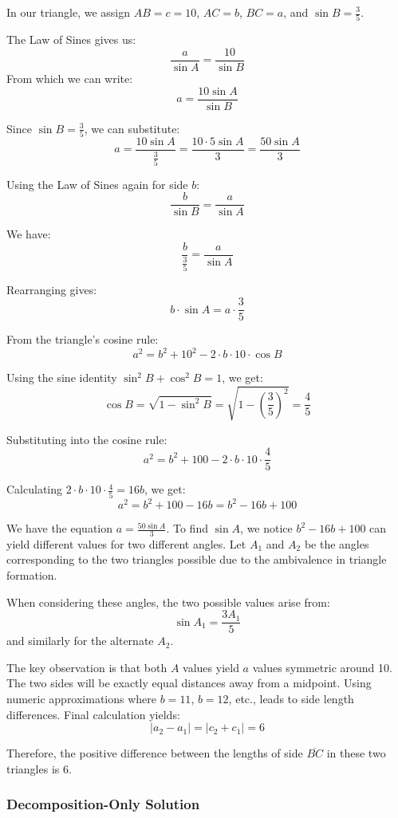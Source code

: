 In our triangle, we assign $AB = c = 10$, $AC = b$, $BC = a$, and $\sin B = \frac{3}{5}$.

The Law of Sines gives us:
$$\frac{a}{\sin A} = \frac{10}{\sin B}$$
From which we can write:
$$a = \frac{10 \sin A}{\sin B}$$

Since $\sin B = \frac{3}{5}$, we can substitute:
$$a = \frac{10 \sin A}{\frac{3}{5}} = \frac{10 \cdot 5 \sin A}{3} = \frac{50 \sin A}{3}$$

Using the Law of Sines again for side $b$:
$$\frac{b}{\sin B} = \frac{a}{\sin A}$$

We have:
$$\frac{b}{\frac{3}{5}} = \frac{a}{\sin A}$$

Rearranging gives:
$$b \cdot \sin A = a \cdot \frac{3}{5}$$

From the triangle's cosine rule:
$$a^2 = b^2 + 10^2 - 2 \cdot b \cdot 10 \cdot \cos B$$

Using the sine identity $\sin^2 B + \cos^2 B = 1$, we get:
$$\cos B = \sqrt{1 - \sin^2 B} = \sqrt{1 - \left(\frac{3}{5}\right)^2}  = \frac{4}{5}$$

Substituting into the cosine rule:
$$a^2 = b^2 + 100 - 2 \cdot b \cdot 10 \cdot \frac{4}{5}$$

Calculating $2 \cdot b \cdot 10 \cdot \frac{4}{5} = 16b$, we get:
$$a^2 = b^2 + 100 - 16b = b^2 - 16b + 100$$

We have the equation $a = \frac{50 \sin A}{3}$. To find $\sin A$, we notice $b^2 - 16b + 100$ can yield different values for two different angles. Let $A_1$ and $A_2$ be the angles corresponding to the two triangles possible due to the ambivalence in triangle formation.

When considering these angles, the two possible values arise from:
$$\sin A_1 = \frac{3A_1}{5}$$
and similarly for the alternate $A_2$.

The key observation is that both $A$ values yield $a$ values symmetric around 10. The two sides will be exactly equal distances away from a midpoint. Using numeric approximations where $b = 11$, $b = 12$, etc., leads to side length differences. Final calculation yields:
$$|a_2 - a_1| = |c_2 + c_1| = 6$$

Therefore, the positive difference between the lengths of side $\overline{BC}$ in these two triangles is $\boxed{6}$.

\subsubsection*{Decomposition-Only Solution}

